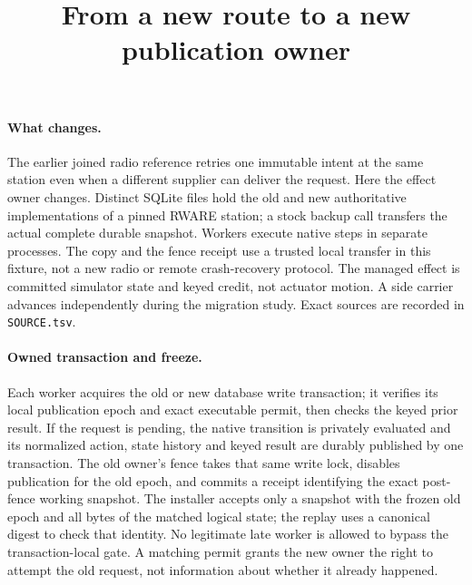\documentclass{article}
\title{From a new route to a new publication owner}
\date{}
\begin{document}
\maketitle

\paragraph{What changes.}
The earlier joined radio reference retries one immutable intent at
the same station even when a different supplier can deliver the
request. Here the effect owner changes. Distinct SQLite files hold
the old and new authoritative implementations of a pinned RWARE
station; a stock backup call transfers the actual complete durable
snapshot. Workers execute native steps in separate processes. The
copy and the fence receipt use a trusted local transfer in this
fixture, not a new radio or remote crash-recovery protocol.
The managed effect is committed simulator state and keyed credit,
not actuator motion. A side carrier advances independently during
the migration study. Exact sources are recorded in \verb|SOURCE.tsv|.

\paragraph{Owned transaction and freeze.}
Each worker acquires the old or new database write transaction;
it verifies its local publication epoch and exact executable
permit, then checks the keyed prior result. If the request is
pending, the native transition is privately evaluated and its
normalized action, state history and keyed result are durably
published by one transaction. The old owner's fence takes that
same write lock, disables publication for the old epoch, and
commits a receipt identifying the exact post-fence working
snapshot. The installer accepts only a snapshot with the frozen
old epoch and all bytes of the matched logical state; the replay
uses a canonical digest to check that identity. No legitimate
late worker is allowed to bypass the transaction-local gate.
A matching permit grants the new owner the right to attempt the
old request, not information about whether it already happened.
\end{document}
